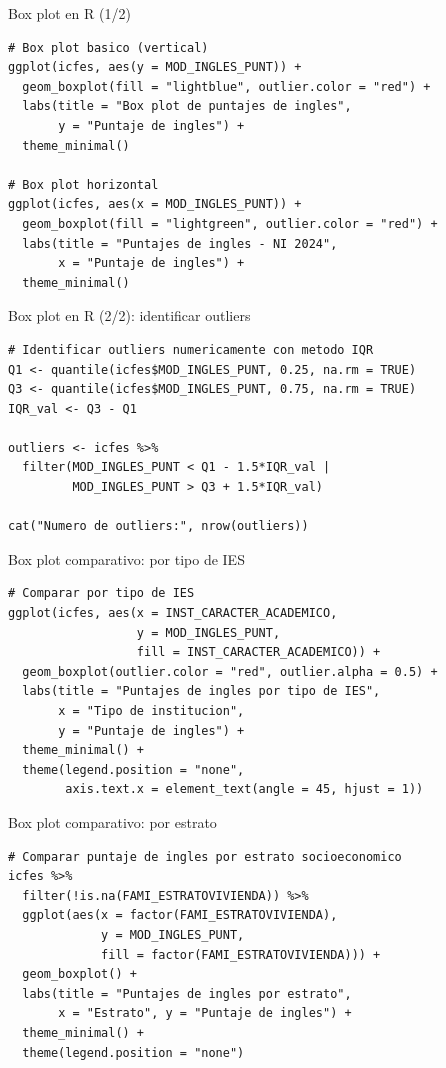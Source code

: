 \documentclass[aspectratio=169, 11pt]{beamer}
\begin{document}
\begin{frame}[fragile]{Box plot en R (1/2)}
\begin{lstlisting}
# Box plot basico (vertical)
ggplot(icfes, aes(y = MOD_INGLES_PUNT)) +
  geom_boxplot(fill = "lightblue", outlier.color = "red") +
  labs(title = "Box plot de puntajes de ingles",
       y = "Puntaje de ingles") +
  theme_minimal()

# Box plot horizontal
ggplot(icfes, aes(x = MOD_INGLES_PUNT)) +
  geom_boxplot(fill = "lightgreen", outlier.color = "red") +
  labs(title = "Puntajes de ingles - NI 2024",
       x = "Puntaje de ingles") +
  theme_minimal()
\end{lstlisting}
\end{frame}

\begin{frame}[fragile]{Box plot en R (2/2): identificar outliers}
\begin{lstlisting}
# Identificar outliers numericamente con metodo IQR
Q1 <- quantile(icfes$MOD_INGLES_PUNT, 0.25, na.rm = TRUE)
Q3 <- quantile(icfes$MOD_INGLES_PUNT, 0.75, na.rm = TRUE)
IQR_val <- Q3 - Q1

outliers <- icfes %>%
  filter(MOD_INGLES_PUNT < Q1 - 1.5*IQR_val |
         MOD_INGLES_PUNT > Q3 + 1.5*IQR_val)

cat("Numero de outliers:", nrow(outliers))
\end{lstlisting}
\end{frame}

\begin{frame}[fragile]{Box plot comparativo: por tipo de IES}
\begin{lstlisting}
# Comparar por tipo de IES
ggplot(icfes, aes(x = INST_CARACTER_ACADEMICO,
                  y = MOD_INGLES_PUNT,
                  fill = INST_CARACTER_ACADEMICO)) +
  geom_boxplot(outlier.color = "red", outlier.alpha = 0.5) +
  labs(title = "Puntajes de ingles por tipo de IES",
       x = "Tipo de institucion",
       y = "Puntaje de ingles") +
  theme_minimal() +
  theme(legend.position = "none",
        axis.text.x = element_text(angle = 45, hjust = 1))
\end{lstlisting}
\end{frame}

\begin{frame}[fragile]{Box plot comparativo: por estrato}
\begin{lstlisting}
# Comparar puntaje de ingles por estrato socioeconomico
icfes %>%
  filter(!is.na(FAMI_ESTRATOVIVIENDA)) %>%
  ggplot(aes(x = factor(FAMI_ESTRATOVIVIENDA),
             y = MOD_INGLES_PUNT,
             fill = factor(FAMI_ESTRATOVIVIENDA))) +
  geom_boxplot() +
  labs(title = "Puntajes de ingles por estrato",
       x = "Estrato", y = "Puntaje de ingles") +
  theme_minimal() +
  theme(legend.position = "none")
\end{lstlisting}
\end{frame}
\end{document}
